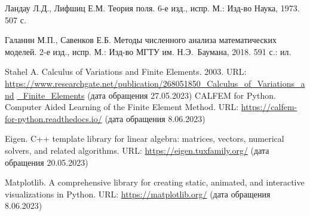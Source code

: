 \documentclass[12pt, a4paper]{article}
\begin{document}
	\begin{thebibliography}{4}
		
		 Ландау Л.Д., Лифшиц Е.М. Теория поля. 6-е изд., испр. М.: Изд-во Наука, 1973. 507 с.
		
		 Галанин М.П., Савенков Е.Б. Методы численного анализа математических моделей. 2-е изд., испр. М.: Изд-во МГТУ им. Н.Э.~Баумана, 2018. 591 с.: ил. 
		
		 Stahel A. Calculus of Variations and Finite Elements. 2003. 
		URL:
		\href{https://www.researchgate.net/publication/268051850_Calculus_of_Variations_and_Finite_Elements}{https://www.researchgate.net/publication/268051850\_Calculus\_of\_Variations\_and} \href{https://www.researchgate.net/publication/268051850_Calculus_of_Variations_and_Finite_Elements}{\_Finite\_Elements} (дата обращения 27.05.2023)	
		 CALFEM for Python. Computer Aided Learning of the Finite Element Method. 
		URL:  \href{https://calfem-for-python.readthedocs.io}{https://calfem-for-python.readthedocs.io/}
		(дата обращения 8.06.2023)	
		
		
		 Eigen. C++ template library for linear algebra: matrices, vectors, numerical solvers, and related algorithms.
		URL:  \href{https://eigen.tuxfamily.org}{https://eigen.tuxfamily.org/}
		(дата обращения 20.05.2023)
					
		
		
		 Matplotlib. A comprehensive library for creating static, animated, and interactive visualizations in Python. 
		URL:  \href{https://matplotlib.org/}{https://matplotlib.org/}
		(дата обращения 8.06.2023)
		
		
		
	\end{thebibliography}
	
\end{document}

